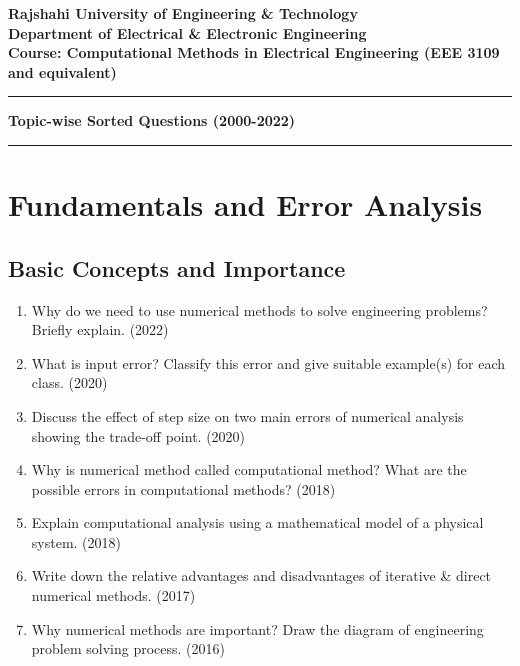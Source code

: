 \documentclass[12pt, a4paper]{article}
\begin{document}
	
	\begin{center}
		\large\textbf{Rajshahi University of Engineering \& Technology} \\
		\textbf{Department of Electrical \& Electronic Engineering} \\
		\textbf{Course: Computational Methods in Electrical Engineering (EEE 3109 and equivalent)} \\
		\hrule
		\vspace{0.5cm}
		\huge\textbf{Topic-wise Sorted Questions (2000-2022)}
		\vspace{0.5cm}
		\hrule
	\end{center}
	
	\tableofcontents
	\newpage
	
	\section{Fundamentals and Error Analysis}
	
	\subsection{Basic Concepts and Importance}
	\begin{enumerate}
		\item Why do we need to use numerical methods to solve engineering problems? Briefly explain. (2022)
		\item What is input error? Classify this error and give suitable example(s) for each class. (2020)
		\item Discuss the effect of step size on two main errors of numerical analysis showing the trade-off point. (2020)
		\item Why is numerical method called computational method? What are the possible errors in computational methods? (2018)
		\item Explain computational analysis using a mathematical model of a physical system. (2018)
		\item Write down the relative advantages and disadvantages of iterative \& direct numerical methods. (2017)
		\item Why numerical methods are important? Draw the diagram of engineering problem solving process. (2016)
	\end{enumerate}
	
\end{document}
